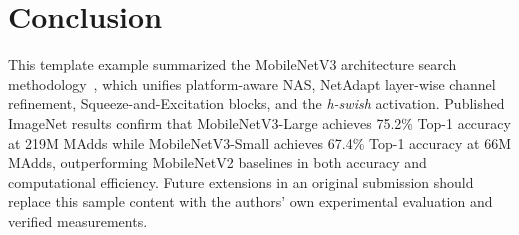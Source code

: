 \section{Conclusion}\label{sec:conclusion}
This template example summarized the MobileNetV3 architecture search methodology~\cite{howard2019mobilenetv3}, which unifies platform-aware NAS, NetAdapt layer-wise channel refinement, Squeeze-and-Excitation blocks, and the \textit{h-swish} activation.
Published ImageNet results confirm that MobileNetV3-Large achieves 75.2\% Top-1 accuracy at 219M MAdds while MobileNetV3-Small achieves 67.4\% Top-1 accuracy at 66M MAdds, outperforming MobileNetV2 baselines in both accuracy and computational efficiency.
Future extensions in an original submission should replace this sample content with the authors' own experimental evaluation and verified measurements.
